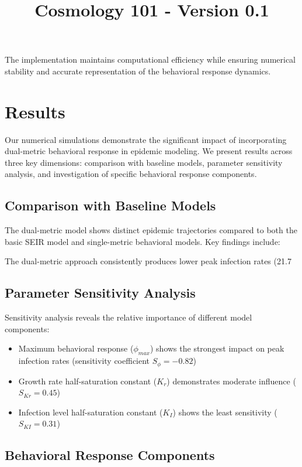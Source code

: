 \documentclass{article}\usepackage{graphicx} \usepackage{amsmath} \usepackage{colortbl}\title{Cosmology 101 - Version 0.1}
\begin{document}
The implementation maintains computational efficiency while ensuring numerical stability and accurate representation of the behavioral response dynamics.\section{Results}
Our numerical simulations demonstrate the significant impact of incorporating dual-metric behavioral response in epidemic modeling. We present results across three key dimensions: comparison with baseline models, parameter sensitivity analysis, and investigation of specific behavioral response components.

\subsection{Comparison with Baseline Models}

The dual-metric model shows distinct epidemic trajectories compared to both the basic SEIR model and single-metric behavioral models. Key findings include:


The dual-metric approach consistently produces lower peak infection rates (21.7%

\subsection{Parameter Sensitivity Analysis}

Sensitivity analysis reveals the relative importance of different model components:

\begin{itemize}
\item Maximum behavioral response ($\phi_{max}$) shows the strongest impact on peak infection rates (sensitivity coefficient $S_{\phi} = -0.82$)
\item Growth rate half-saturation constant ($K_r$) demonstrates moderate influence ($S_{Kr} = 0.45$)
\item Infection level half-saturation constant ($K_I$) shows the least sensitivity ($S_{KI} = 0.31$)
\end{itemize}

\subsection{Behavioral Response Components}
\end{document}
